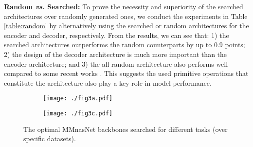 \documentclass[sigconf]{acmart}
\begin{document}
\noindent\textbf{Random \textit{vs.} Searched:} To prove the necessity and superiority of the searched architectures over randomly generated ones, we conduct the experiments in Table \ref{table:random} by alternatively using the searched or random architectures for the encoder and decoder, respectively. From the results, we can see that: 1) the searched architectures outperforms the random counterparts by up to 0.9 points; 2) the design of the decoder architecture is much more important than the encoder architecture; and 3) the all-random architecture also performs well compared to some recent works \cite{kim2018bilinear, gao2019dynamic}. This suggests the used primitive operations that constitute the architecture also play a key role in model performance.

\captionsetup[subfigure]{font=small}
\begin{figure}
    \centering
    \begin{subfigure}[h]{0.325\columnwidth}
        \texttt{[image: ./fig3a.pdf]}
        \caption{}\label{fig:itm_arch}
    \end{subfigure}
    \begin{subfigure}[h]{0.325\columnwidth}
        \texttt{[image: ./fig3c.pdf]}
        \caption{}\label{fig:vg_arch}
    \end{subfigure}
\caption{The optimal MMnasNet backbones searched for different tasks (over specific datasets).}
    \label{fig:mmnasnet_arch}
\end{figure}
\end{document}
